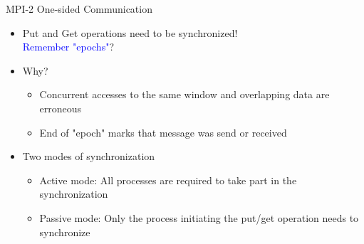 \documentclass[svgnames]{beamer}
\begin{document}
\begin{frame}{MPI-2 One-sided Communication}
	\begin{itemize}
		\item Put and Get operations need to be synchronized!\\
					\textcolor{blue}{Remember "epochs"}?
		\item Why?
		\begin{itemize}
			\item Concurrent accesses to the same window and overlapping data are erroneous
			\item End of "epoch" marks that message was send or received
		\end{itemize}
		\item Two modes of synchronization
		\begin{itemize}
			\item Active mode: All processes are required to take part in the synchronization
			\item Passive mode: Only the process initiating the put/get operation needs to synchronize
		\end{itemize}
	\end{itemize}
\end{frame}
\end{document}
